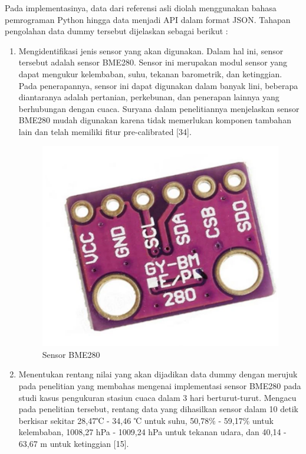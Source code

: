\begin{enumerate}[label={\alph*.}]
	Pada implementasinya, data dari referensi asli diolah menggunakan bahasa pemrograman Python hingga data menjadi API dalam format JSON. Tahapan pengolahan data dummy tersebut dijelaskan sebagai berikut : \\
	\begin{enumerate}[label={\arabic*.}]
		\item Mengidentifikasi jenis sensor yang akan digunakan. Dalam hal ini, sensor tersebut adalah sensor BME280. Sensor ini merupakan modul sensor yang dapat mengukur kelembaban, suhu, tekanan barometrik, dan ketinggian. Pada penerapannya, sensor ini dapat digunakan dalam banyak lini, beberapa diantaranya adalah pertanian, perkebunan, dan penerapan lainnya yang berhubungan dengan cuaca. Suryana dalam penelitiannya menjelaskan sensor BME280 mudah digunakan karena tidak memerlukan komponen tambahan lain dan telah memiliki fitur pre-calibrated [34].
		\begin{figure}[H]
			\centering
			\includegraphics[width=0.8\linewidth]{gambar/Dasar teori/Sensor BME280.png}
			\caption{Sensor BME280}
			\label{gambar1}
		\end{figure}
		
		\item Menentukan rentang nilai yang akan dijadikan data dummy dengan merujuk pada penelitian yang membahas mengenai implementasi sensor BME280 pada studi kasus pengukuran stasiun cuaca dalam 3 hari berturut-turut. Mengacu pada penelitian tersebut, rentang data yang dihasilkan sensor dalam 10 detik berkisar sekitar 28,47℃ - 34,46 ℃ untuk suhu, 50,78\% - 59,17\% untuk kelembaban, 1008,27 hPa - 1009,24 hPa untuk tekanan udara, dan 40,14 - 63,67 m untuk ketinggian [15]. 
		

\end{enumerate}
\end{enumerate}
